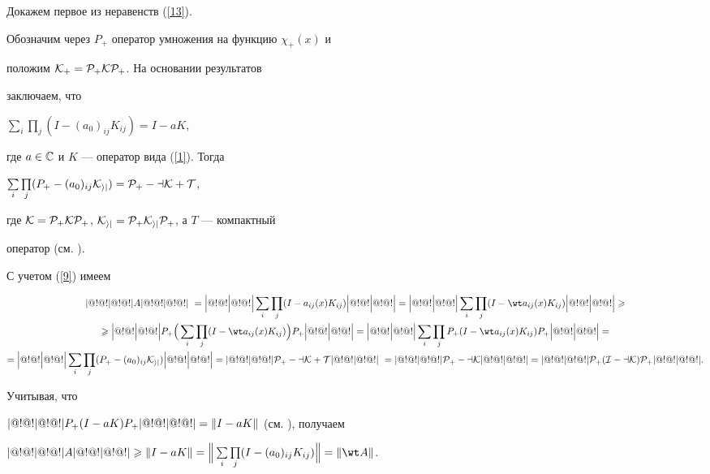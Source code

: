 \begin{pf}


Докажем первое из неравенств (\ref{13}).


Обозначим через $P_+$ оператор умножения на функцию $\chi_+(x)$ и


положим $\cal K_+=P_+KP_+$. На основании результатов \cite{b3}


заключаем, что


$\sum\limits_i\prod\limits_j (I-(a_0)_{ij}K_{ij})=I-aK$,


где $a\in\Bbb C$ и $K$ --- оператор вида (\ref{1}). Тогда


$\sum\limits_i\prod\limits_j (P_+-(a_0)_{ij}\cal K_{ij})=P_+-a\cal K+T$,


где $\cal K=P_+KP_+$, $\cal K_{ij}=P_+K_{ij}P_+$, а $T$ --- компактный


оператор (см. \cite{b3}).





С учетом (\ref{9}) имеем


\begin{multline*}


\trivert A\trivert\ =


\Big|@!@!\Big|@!@!\Big|\sum_i\prod_j (I-a_{ij}(x)K_{ij})


\Big|@!@!\Big|@!@!\Big|=


\Big|@!@!\Big|@!@!\Big| \sum_i\prod_j(I-\wt a_{ij}(x)K_{ij})


\Big|@!@!\Big|@!@!\Big| \geqslant \\


%


\geqslant\Big|@!@!\Big|@!@!\Big| P_+\Big(\sum_i\prod_j(I-\wt


a_{ij}(x)K_{ij})\Big)P_+\Big|@!@!\Big|@!@!\Big| =


\Big|@!@!\Big|@!@!\Big| \sum_i\prod_j P_+(I-\wt a_{ij}(x)K_{ij})P_+


\Big|@!@!\Big|@!@!\Big| =\\


%


= \Big|@!@!\Big|@!@!\Big|\sum_i\prod_j(P_+-(a_0)_{ij}\cal K_{ij})


\Big|@!@!\Big|@!@!\Big|=


\trivert P_+-a\cal K+T\trivert\ =\trivert P_+-a\cal K\trivert =


\trivert P_+(I-aK)P_+\trivert.


\end{multline*}


Учитывая, что


$|@!@!|@!@!| P_+(I-aK)P_+|@!@!|@!@!|=\|I-aK \|$ (см. \cite{b3}), получаем


$\trivert A\trivert\geqslant \|I-aK\|=


\Big\|\sum\limits_i\prod\limits_j(I-(a_0)_{ij}K_{ij})\Big\|=\|\wt A \|$.


\end{pf}





